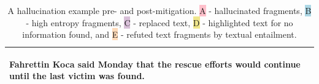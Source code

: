 \begin{table}[H]
{\begin{tabular}{p{}|p{}}
\begin{Large}
Fahrettin Koca said Monday that the rescue efforts would continue until the last victim was found.
\end{Large}
\\ \bottomrule
\end{tabular}%
}
\vspace{-2mm}
\caption{A hallucination example pre- and post-mitigation. \colorbox{pink}{A} - hallucinated fragments, \colorbox{LightBlue}{B} - high entropy fragments, \colorbox{Thistle}{C} - replaced text, \colorbox{Khaki}{D} - highlighted text for no information found, and \colorbox{PeachPuff}{E} - refuted text fragments by textual entailment.} 
\label{tab:hallucination_ex_2}
\end{table}

